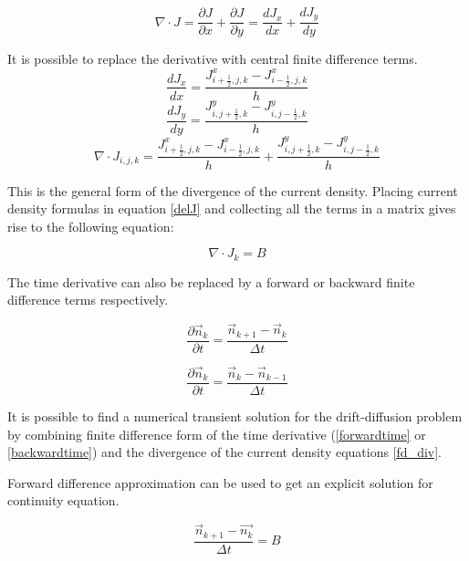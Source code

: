 \begin{equation}
\nabla \cdot J=\frac{\partial J}{\partial x}+\frac{\partial J}{\partial y}=\frac{d J_x}{d x}+\frac{d J_y}{d y}
\end{equation}

It is possible to replace the derivative with central finite difference terms.
\begin{equation}
\frac{d J_x}{d x}=\frac{J^x_{i+\frac{1}{2},j,k}-J^x_{i-\frac{1}{2},j,k}}{h}
\end{equation}
\begin{equation}
\frac{d J_y}{d y}=\frac{J^y_{i,j+\frac{1}{2},k}-J^y_{i,j-\frac{1}{2},k}}{h}
\end{equation}
\begin{equation}
\nabla \cdot J_{i,j,k}=\frac{J^x_{i+\frac{1}{2},j,k}-J^x_{i-\frac{1}{2},j,k}}{h}+\frac{J^y_{i,j+\frac{1}{2},k}-J^y_{i,j-\frac{1}{2},k}}{h}
\label{delJ}
\end{equation}

This is the general form of the divergence of the current density. Placing current density formulas in equation \ref{delJ} and collecting all the terms in a matrix gives rise to the following equation:

\begin{equation}
\nabla \cdot J_k =B
\label{fd_div}
\end{equation}

The time derivative can also be replaced by a forward or backward finite difference terms respectively.

\begin{equation}
\frac{\partial  \vec{n}_k}{\partial t}=\frac{ \vec{n}_{k+1}-\vec{n}_k}{\Delta t}
\label{forwardtime}
\end{equation}

\begin{equation}
\frac{\partial \vec{n}_k}{\partial t}=\frac{ \vec{n}_k- \vec{n}_{k-1}}{\Delta t}
\label{backwardtime}
\end{equation}

It is possible to find a numerical transient solution for the drift-diffusion problem by combining finite difference form of the time derivative (\eqref{forwardtime} or \eqref{backwardtime}) and the divergence of the current density equations \eqref{fd_div}.

Forward difference approximation can be used to get an explicit solution for continuity equation.

\begin{equation}\nonumber
\frac{ \vec{n}_{k+1}-\vec{n_k}}{\Delta t}=B
\end{equation}

